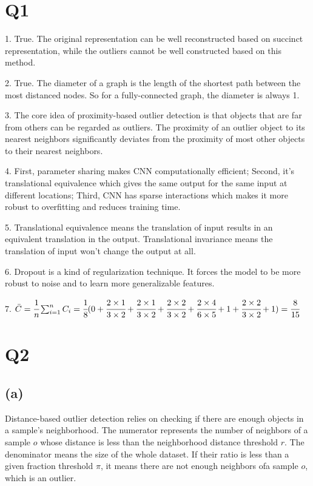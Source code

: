 \documentclass[]{article}
\begin{document}
\section*{Q1}
1. True. The original representation can be well reconstructed based on succinct representation, while the outliers cannot be well constructed based on this method.

2. True. The diameter of a graph is the length of the shortest path between the most distanced nodes. So for a fully-connected graph, the diameter is always 1.

3. The core idea of proximity-based outlier detection is that objects that are far from others can be regarded as outliers. The proximity of an outlier object to its nearest neighbors significantly deviates from the proximity of most other objects to their nearest neighbors.

4. First, parameter sharing makes CNN computationally efficient; Second, it's translational equivalence which gives the same output for the same input at different locations; Third, CNN has sparse interactions which makes it more robust to overfitting and reduces training time. 

5. Translational equivalence means the translation of input results in an equivalent translation in the output. Translational invariance means the translation of input won't change the output at all.

6. Dropout is a kind of regularization technique. It forces the model to be more robust to noise and to learn more generalizable features.

7. $\bar{C}=\cfrac{1}{n}\sum_{i=1}^nC_i=\cfrac{1}{8}(0+\cfrac{2\times1}{3\times2}+\cfrac{2\times1}{3\times2}+\cfrac{2\times2}{3\times2}+\cfrac{2\times4}{6\times5}+1+\cfrac{2\times2}{3\times2}+1)=\cfrac{8}{15}$ 

\newpage

\section*{Q2}
\subsection*{(a)} 
Distance-based outlier detection relies on checking if there are enough objects in a sample's neighborhood. The numerator represents the number of neighbors of a sample $o$ whose distance is less than the neighborhood distance threshold $r$. The denominator means the size of the whole dataset. If their ratio is less than a given fraction threshold $\pi$, it means there are not enough neighbors ofa  sample $o$, which is an outlier.
\end{document}
